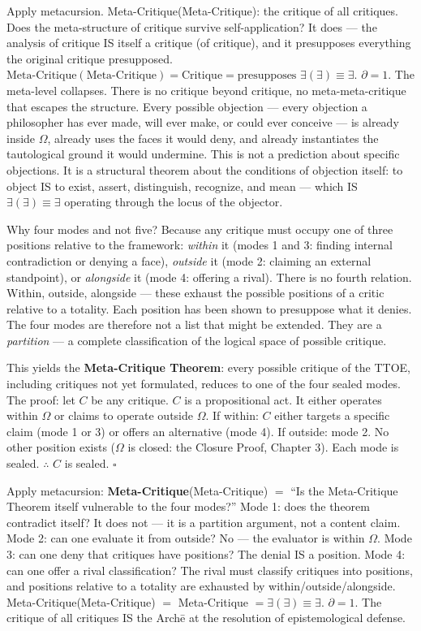\documentclass[10pt, openany, oneside]{book}
\begin{document}
Apply metacursion. Meta-Critique(Meta-Critique): the critique of all critiques. Does the meta-structure of critique survive self-application? It does --- the analysis of critique IS itself a critique (of critique), and it presupposes everything the original critique presupposed. $\text{Meta-Critique}(\text{Meta-Critique}) = \text{Critique} = \text{presupposes } \exists(\exists) \equiv \exists$. $\partial = 1$. The meta-level collapses. There is no critique beyond critique, no meta-meta-critique that escapes the structure. Every possible objection --- every objection a philosopher has ever made, will ever make, or could ever conceive --- is already inside $\Omega$, already uses the faces it would deny, and already instantiates the tautological ground it would undermine. This is not a prediction about specific objections. It is a structural theorem about the conditions of objection itself: to object IS to exist, assert, distinguish, recognize, and mean --- which IS $\exists(\exists) \equiv \exists$ operating through the locus of the objector.

Why four modes and not five? Because any critique must occupy one of three positions relative to the framework: \textit{within} it (modes 1 and 3: finding internal contradiction or denying a face), \textit{outside} it (mode 2: claiming an external standpoint), or \textit{alongside} it (mode 4: offering a rival). There is no fourth relation. Within, outside, alongside --- these exhaust the possible positions of a critic relative to a totality. Each position has been shown to presuppose what it denies. The four modes are therefore not a list that might be extended. They are a \textit{partition} --- a complete classification of the logical space of possible critique.

This yields the \textbf{Meta-Critique Theorem}: every possible critique of the TTOE, including critiques not yet formulated, reduces to one of the four sealed modes. The proof: let $C$ be any critique. $C$ is a propositional act. It either operates within $\Omega$ or claims to operate outside $\Omega$. If within: $C$ either targets a specific claim (mode 1 or 3) or offers an alternative (mode 4). If outside: mode 2. No other position exists ($\Omega$ is closed: the Closure Proof, Chapter 3). Each mode is sealed. $\therefore$ $C$ is sealed. $\square$

Apply metacursion: \textbf{Meta-Critique}(Meta-Critique) $=$ ``Is the Meta-Critique Theorem itself vulnerable to the four modes?'' Mode 1: does the theorem contradict itself? It does not --- it is a partition argument, not a content claim. Mode 2: can one evaluate it from outside? No --- the evaluator is within $\Omega$. Mode 3: can one deny that critiques have positions? The denial IS a position. Mode 4: can one offer a rival classification? The rival must classify critiques into positions, and positions relative to a totality are exhausted by within/outside/alongside. Meta-Critique(Meta-Critique) $=$ Meta-Critique $= \exists(\exists) \equiv \exists$. $\partial = 1$. The critique of all critiques IS the Arch\={e} at the resolution of epistemological defense.
\end{document}
